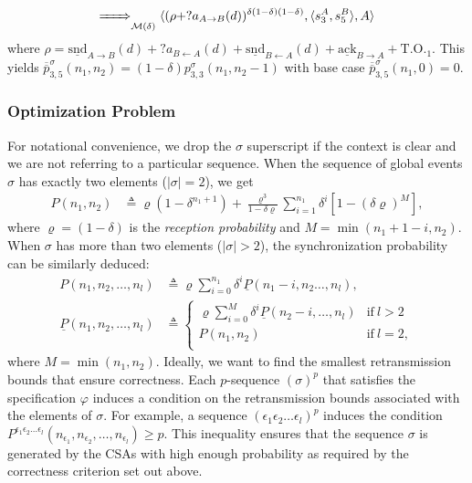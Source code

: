 \documentclass{sig-alternate}
\renewcommand{\v}{\varphi}
\newcommand{\e}{\epsilon}
\renewcommand{\d}{\delta}
\newcommand{\timeout}{\mathrm{T.O.}}
\newcommand{\locev}[1]{\underline{#1}}
\newcommand{\len}[1]{|{#1}|}
\newcommand{\snd}{\mathrm{snd}}
\newcommand{\ack}{\mathrm{ack}}
\newcommand{\env}[4]{\locev{#1}_{{#2} \rightarrow {#3}}(#4)}
\newcommand{\eenv}[3]{\locev{#1}_{{#2} \rightarrow {#3}}}
\newcommand{\sys}[4]{\locev{#1}_{{#2} \leftarrow {#3}}(#4)}
\newcommand{\define}{\sl}
\begin{document}
\begin{align*}
	\bigstep{} \langle (\rho + ?a_{A \rightarrow B}(d))^{\d(1 - \d)(1 - \d)}, \langle s^A_3, s^B_5 \rangle, A \rangle
\end{align*}
where $\rho = \env{\snd}{A}{B}{d} + ?a_{B \leftarrow A}(d) + \sys{\snd}{B}{A}{d} + \eenv{\ack}{B}{A} + \timeout_1$. This yields $\overline{\overline{p}}^{\sigma}_{3, 5}(n_1, n_2) = (1 - \d)p^{\sigma}_{3, 3}(n_1, n_2 - 1)$ with base case $\overline{\overline{p}}^{\sigma}_{3, 5}(n_1, 0) = 0$.


\subsubsection{Optimization Problem}

For notational convenience, we drop the $\sigma$ superscript if the context is clear and we are not referring to a particular sequence. When the sequence of global events $\sigma$ has exactly two elements ($\len{\sigma} = 2$), we get
\newcommand{\dd}{\varrho}
\begin{align*}
	P(n_1, n_2) &\triangleq \dd(1-\d^{n_1+1}) + \frac{\dd^3}{1-\d\dd}\sum_{i=1}^{n_1}{\d^i\left[1-(\d\dd)^{M}\right]},
\end{align*}
where $\dd = (1-\d)$ is the {\define reception probability} and $M = \min{(n_1+1-i, n_2)}$. When $\sigma$ has more than two elements ($\len{\sigma} > 2$), the synchronization probability can be similarly deduced:
\begin{align*}
	P(n_1, n_2, \ldots, n_l) &\triangleq \dd \sum_{i = 0}^{n_1}{\d^{i}\locev{P}(n_1 - i, n_2 \ldots, n_l)}, \\
	\locev{P}(n_1, n_2, \ldots, n_l) &\triangleq \begin{cases}\dd \sum_{i = 0}^{M}{\d^{i}\locev{P}(n_2 - i, \ldots, n_l)} &\text{if}~l > 2 \\
		P(n_1, n_2) &\text{if}~l = 2, \\	
	\end{cases}
\end{align*}
where $M = \min{(n_1, n_2)}$. Ideally, we want to find the smallest retransmission bounds that ensure correctness. Each $p$-sequence $(\sigma)^p$ that satisfies the specification $\v$ induces a condition on the retransmission bounds associated with the elements of $\sigma$. For example, a sequence $(\e_1\e_2\ldots\e_l)^p$ induces the condition  $P^{\e_1\e_2\ldots\e_l}(n_{\e_1}, n_{\e_2}, \ldots, n_{\e_l}) \geq p$. This inequality ensures that the sequence $\sigma$ is generated by the CSAs with high enough probability as required by the correctness criterion set out above.
\end{document}
